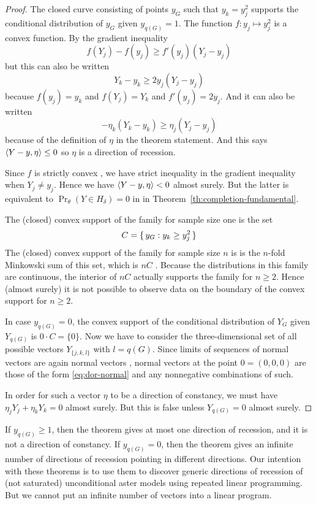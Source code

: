 \begin{proof}
The closed curve consisting of points $y_G$ such that $y_k = y_j^2$
supports the conditional distribution of $y_G$ given $y_{q(G)} = 1$.
The function $f : y_j \mapsto y_j^2$ is a convex function.
By the gradient inequality \citep[Theorem~2.13 (b)]{rockafellar-wets}
$$
   f(Y_j) - f(y_j) \ge f'(y_j) (Y_j - y_j)
$$
but this can also be written
$$
   Y_k - y_k \ge 2 y_j (Y_j - y_j)
$$
because $f(y_j) = y_k$ and $f(Y_j) = Y_k$ and $f'(y_j) = 2 y_j$.
And it can also be written
$$
   - \eta_k (Y_k - y_k) \ge \eta_j (Y_j - y_j)
$$
because of the definition of $\eta$ in the theorem statement.
And this says $\langle Y - y, \eta \rangle \le 0$ so $\eta$ is a direction of
recession.

Since $f$ is strictly convex
\citep[Theorem~2.13 ($\text{a}'$)]{rockafellar-wets},
we have strict inequality in the gradient inequality
\citep[Theorem~2.13 ($\text{b}'$)]{rockafellar-wets} when $Y_j \neq y_j$.
Hence we have \hbox{$\langle Y - y, \eta \rangle < 0$} almost surely.
But the latter is equivalent to $\Pr_\theta(Y \in H_\delta) = 0$ in
in Theorem~\ref{th:completion-fundamental}.

The (closed) convex support of the family for sample size one is
the set
$$
   C = \{\,  y_G : y_k \ge y_j^2  \,\}
$$
The (closed) convex support of the family for sample size $n$ is
is the $n$-fold Minkowski sum of this set, which is $n C$
\citep[Proposition~2.23]{rockafellar-wets}.  Because the distributions
in this family are continuous, the interior of $n C$ actually supports
the family for $n \ge 2$.  Hence (almost surely) it is not possible
to observe data on the boundary of the convex support for $n \ge 2$.

In case $y_{q(G)} = 0$, the convex support of the conditional distribution
of $Y_G$ given $Y_{q(G)}$ is $0 \cdot C = \{ 0 \}$.
Now we have to consider the three-dimensional set of all possible vectors
$Y_{\{j, k, l\}}$ with $l = q(G)$.  Since limits of sequences of normal vectors
are again normal vectors
\citep[Proposition~6.6 and Theorem~6.9]{rockafellar-wets},
normal vectors at the point $0 = (0, 0, 0)$ are those of the form
\eqref{eq:dor-normal} and any nonnegative combinations of such.

In order for such a vector $\eta$ to be a direction of constancy,
we must have $\eta_j Y_j + \eta_k Y_k = 0$ almost surely.
But this is false unless $Y_{q(G)} = 0$ almost surely.
\end{proof}

If $y_{q(G)} \ge 1$, then the theorem gives at most one direction of recession,
and it is not a direction of constancy.
If $y_{q(G)} = 0$, then the theorem gives an infinite number of directions
of recession pointing in different directions.
Our intention with these theorems is to use them to discover generic
directions of recession of (not saturated) unconditional aster models
using repeated linear programming.  But we cannot put an infinite number
of vectors into a linear program.

